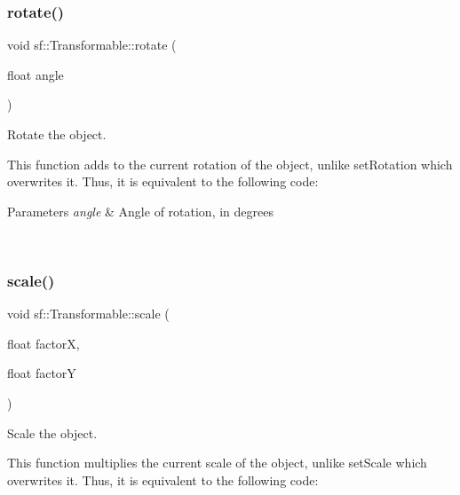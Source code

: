 \subsubsection{\texorpdfstring{rotate()}{rotate()}}
{\footnotesize\ttfamily void sf\+::\+Transformable\+::rotate (\begin{DoxyParamCaption}\item[{float}]{angle }\end{DoxyParamCaption})}



Rotate the object. 

This function adds to the current rotation of the object, unlike set\+Rotation which overwrites it. Thus, it is equivalent to the following code\+: 
\begin{DoxyCode}{0}
\end{DoxyCode}



\begin{DoxyParams}{Parameters}
{\em angle} & Angle of rotation, in degrees \begin{DoxyVerb}\end{DoxyVerb}
 \\
\hline
\end{DoxyParams}
\mbox{\label{classsf_1_1_transformable_a3de0c6d8957f3cf318092f3f60656391}} 
\subsubsection{\texorpdfstring{scale()}{scale()}\hspace{0.1cm}{\footnotesize\ttfamily [1/2]}}
{\footnotesize\ttfamily void sf\+::\+Transformable\+::scale (\begin{DoxyParamCaption}\item[{float}]{factorX,  }\item[{float}]{factorY }\end{DoxyParamCaption})}



Scale the object. 

This function multiplies the current scale of the object, unlike set\+Scale which overwrites it. Thus, it is equivalent to the following code\+: 
\begin{DoxyCode}{0}
\end{DoxyCode}



